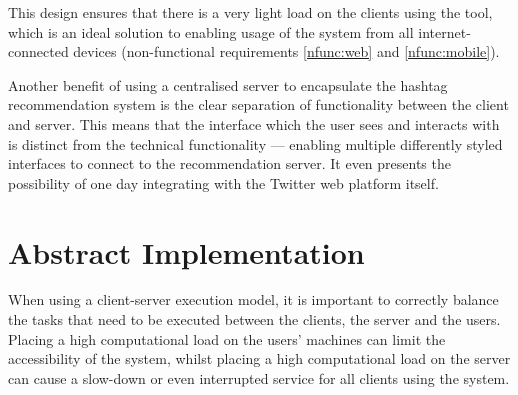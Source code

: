\documentclass[11pt,a4paper]{report}
\begin{document}
This design ensures that there is a very light load on the clients using the tool, which is an ideal solution to enabling usage of the system from all internet-connected devices (non-functional requirements \ref{nfunc:web} and \ref{nfunc:mobile}).

Another benefit of using a centralised server to encapsulate the hashtag recommendation system is the clear separation of functionality between the client and server. This means that the interface which the user sees and interacts with is distinct from the technical functionality --- enabling multiple differently styled interfaces to connect to the recommendation server. It even presents the possibility of one day integrating with the Twitter web platform itself.

\section{Abstract Implementation}

When using a client-server execution model, it is important to correctly balance the tasks that need to be executed between the clients, the server and the users. Placing a high computational load on the users' machines can limit the accessibility of the system, whilst placing a high computational load on the server can cause a slow-down or even interrupted service for all clients using the system.
\end{document}
